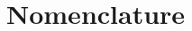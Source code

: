 \documentclass[11pt,a4paper,openany,oneside,parskip=half*]{article}
\begin{document}
\makenomenclature %

\renewcommand{\refname}{}
\renewcommand{\nomname}{}



\setlength{\columnsep}{30pt}

\pagebreak

\tableofcontents{} %
 
\pagebreak

\section{Nomenclature}
\begin{multicols}{2}
\setlength{\columnseprule}{1pt}
\printnomenclature
\end{multicols}
\pagebreak
\end{document}
